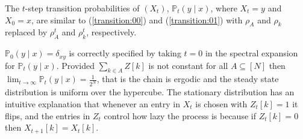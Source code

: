 \documentclass[preprint,11pt]{elsarticle}
\theoremstyle{remark}
\begin{document}
The $t$-step transition probabilities of $(X_t)$, $\mathbb{P}_t(y\mid x)$, where $X_t=y$ and $X_0=x$, are similar to  
(\ref{transition:00}) and (\ref{transition:01}) with $\rho_A$ and $\rho_k$ replaced by
$\rho_A^t$ and $\rho_k^t$, respectively. {$\mathbb{P}_0(y\mid x)=\delta_{xy}$ is correctly specified by taking $t=0$ in the spectral expansion for $\mathbb{P}_t(y\mid x)$. Provided $\sum_{k\in A}Z[k]$ is not constant for all $A\subseteq [N]$ then $\lim_{t\to \infty}\mathbb{P}_t(y\mid x) = \frac{1}{2^N}$, that is the chain is ergodic and the steady state distribution is uniform over the hypercube. The stationary distribution has an intuitive explanation that whenever an entry in $X_t$ is chosen
 with $Z_t[k]=1$ it flips, and the entries in $Z_t$ control how lazy the process is because if $Z_t[k]=0$ then $X_{t+1}[k] = X_t[k]$.

}
\end{document}
